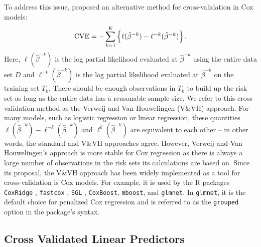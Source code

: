 To address this issue, \citet{Verweij1993} proposed an alternative method for cross-validation in Cox models:
\begin{equation}
\label{eq:VVH}
	\textrm{CVE} = -\sum_{k = 1}^K \left\{ \ell(\hat{\beta}^{- k})  - \ell^{-k}(\hat{\beta}^{- k}) \right\}. 
\end{equation}
Here, $\ell(\hat{\beta}^{-k})$ is the log partial likelihood evaluated at $\hat{\beta}^{-k}$ using the entire data set $D$ and $\ell^{-k}(\hat{\beta}^{-k})$ is the log partial likelihood evaluated at $\hat{\beta}^{-k}$ on %
the training set $T_k$. There should be enough observations in $T_k$ to build up the risk set as long as the entire data has a reasonable sample size. We refer to this cross-validation method as the Verweij and Van Houwelingen (V\&VH) approach. For many models, such as logistic regression or linear regression, these quantities $\ell(\hat{\beta}^{- k})  - \ell^{-k}(\hat{\beta}^{- k})$ and  $\ell^{k}(\hat{\beta}^{-k})$ are equivalent to each other -- in other words, the standard and V\&VH approaches agree.  However, Verweij and Van Houwelingen's approach is more stable for Cox regression as there is always a large number of observations in the risk sets its calculations are based on.  Since its proposal, the V\&VH approach has been widely implemented as a tool for cross-validation is Cox models.  For example, it is used by the R packages {\tt CoxRidge} \citep{CoxRidge}, {\tt fastcox} \citep{fastcox}, {\tt SGL}\citep{SGL} , {\tt CoxBoost}\citep{CoxBoost}, {\tt mboost}\citep{mboost}, and {\tt glmnet}\citep{glmnet}.  In {\tt glmnet}, it is the default choice for penalized Cox regression and is referred to as the {\tt grouped} option in the package's syntax.%

  \subsection{Cross Validated Linear Predictors}

